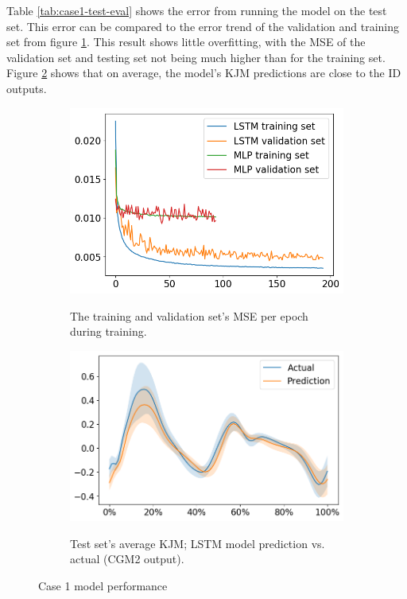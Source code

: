 \documentclass[../main.tex]{subfiles}
\begin{document}
Table \ref{tab:case1-test-eval} shows the error from running the model on the test set.
This error can be compared to the error trend of the validation and training set from figure \ref{fig:case1-training-performance}.
This result shows little overfitting, with the \ac{MSE} of the validation set and testing set not being much higher than for the training set.
Figure \ref{fig:case1-prediction-performance} shows that on average, the model's \ac{KJM} predictions are close to the \ac{ID} outputs.
\begin{figure}[ht!]
    \captionsetup[subfigure]{aboveskip=-12pt}
     \centering
     \begin{subfigure}[b]{0.475\textwidth}
         \centering
         \includegraphics[width=\textwidth]{img/results/training_history/Case1_LSTMvsMLP_training.png}
         \label{fig:case1-training-performance}
         \caption{The training and validation set's \ac{MSE} per epoch during training.}
     \end{subfigure}
     \hfill
     \begin{subfigure}[b]{0.515\textwidth}
         \centering
         \includegraphics[width=\textwidth]{img/results/test_prediction_evaluation/Case1_LSTM_test_prediction.png}
         \label{fig:case1-prediction-performance}
         \caption{Test set's average \ac{KJM}; LSTM model prediction vs. actual (CGM2 output).}
     \end{subfigure}
    \caption{Case 1 model performance}
    \label{fig:case1-performance-plots}
\end{figure}

\end{document}
